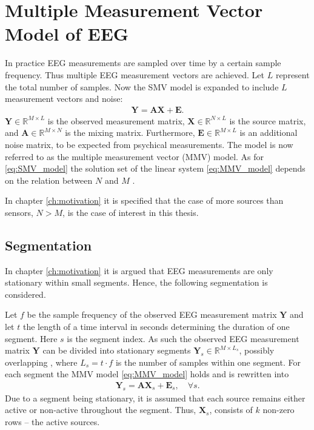 \section{Multiple Measurement Vector Model of EEG}\label{sec:MMV}
In practice EEG measurements are sampled over time by a certain sample frequency. 
Thus multiple EEG measurement vectors are achieved.
Let $L$ represent the total number of samples. 
Now the SMV model is expanded to include $L$ measurement vectors and noise:
\begin{align}\label{eq:MMV_model}
\mathbf{Y} = \mathbf{AX}+\textbf{E}.
\end{align}
$\mathbf{Y} \in \mathbb{R}^{M \times L}$ is the observed measurement matrix, $\mathbf{X} \in \mathbb{R}^{N \times L}$ is the source matrix, and $\mathbf{A} \in \mathbb{R}^{M \times N}$ is the mixing matrix. 
Furthermore, $\mathbf{E} \in \mathbb{R}^{M \times L}$ is an additional noise matrix, to be expected from psychical measurements.  
The model is now referred to as the multiple measurement vector (MMV) model.
As for \eqref{eq:SMV_model} the solution set of the linear system \eqref{eq:MMV_model} depends on the relation between $N$ and $M$ \cite[p. 42]{CS}. 

In chapter \ref{ch:motivation} it is specified that the case of more sources than sensors, $N>M$, is the case of interest in this thesis.  

\subsection{Segmentation}\label{seg_segmentation}
In chapter \ref{ch:motivation} it is argued that EEG measurements are only stationary within small segments. 
Hence, the following segmentation is considered.

Let $f$ be the sample frequency of the observed EEG measurement matrix $\mathbf{Y}$ and let $t$ the length of a time interval in seconds determining the duration of one segment. 
Here $s$ is the segment index. 
As such the observed EEG measurement matrix $\mathbf{Y}$ can be divided into stationary segments $\mathbf{Y}_s \in \mathbb{R}^{M \times L_{s}}$, possibly overlapping , where $L_s = t \cdot f$ is the number of samples within one segment. 
For each segment the MMV model \eqref{eq:MMV_model} holds and is rewritten into 
\begin{align}\label{eq:MMV_seg}
\mathbf{Y}_s = \mathbf{AX}_s + \textbf{E}_s, \quad \forall s.
\end{align}
Due to a segment being stationary, it is assumed that each source remains either active or non-active throughout the segment.
Thus, $\mathbf{X}_s$, consists of $k$ non-zero rows -- the active sources.

